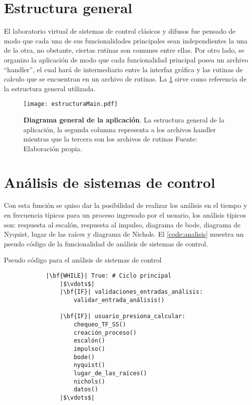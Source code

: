 \section{Estructura general}

    El laboratorio virtual de sistemas de control clásicos y difusos fue pensado de modo que cada una de sus funcionalidades principales sean independientes la una de la otra, no obstante, ciertas rutinas son comunes entre ellas. Por otro lado, se organizo la aplicación de modo que cada funcionalidad principal posea un archivo \enquote{handler}, el cual hará de intermediario entre la interfaz gráfica y las rutinas de calculo que se encuentran en un archivo de rutinas. La \cref{fig:estructuraMain} sirve como referencia de la estructura general utilizada.

    \begin{figure}[htb]
        \centering
        \texttt{[image: estructuraMain.pdf]}
        \caption[Diagrama general de la aplicación]{\textbf{Diagrama general de la aplicación}. La estructura general de la aplicación, la segunda columna representa a los archivos handler mientras que la tercera son los archivos de rutinas  Fuente: Elaboración propia.} 
        \label{fig:estructuraMain}
    \end{figure}

\section{Análisis de sistemas de control}
    
    Con esta función se quiso dar la posibilidad de realizar los análisis en el tiempo y en frecuencia típicos para un proceso ingresado por el usuario, los análisis típicos son: respuesta al escalón, respuesta al impulso, diagrama de bode, diagrama de Nyquist, lugar de las raíces y diagrama de Nichols. El \cref{code:analisis} muestra un pseudo código de la funcionalidad de análisis de sistemas de control.

    \begin{longlisting}
        \caption{Pseudo código para el análisis de sistemas de control}
        \label{code:analisis}				
        \begin{verbatim}
            |\bf{WHILE}| True: # Ciclo principal
                |$\vdots$|
                |\bf{IF}| validaciones_entradas_análisis:
                    validar_entrada_análisis()
                
                |\bf{IF}| usuario_presiona_calcular:
                    chequeo_TF_SS()
                    creación_proceso()
                    escalón()
                    impulso()
                    bode()
                    nyquist()
                    lugar_de_las_raíces()
                    nichols()
                    datos()
                |$\vdots$|
        \end{verbatim}
    \end{longlisting}

